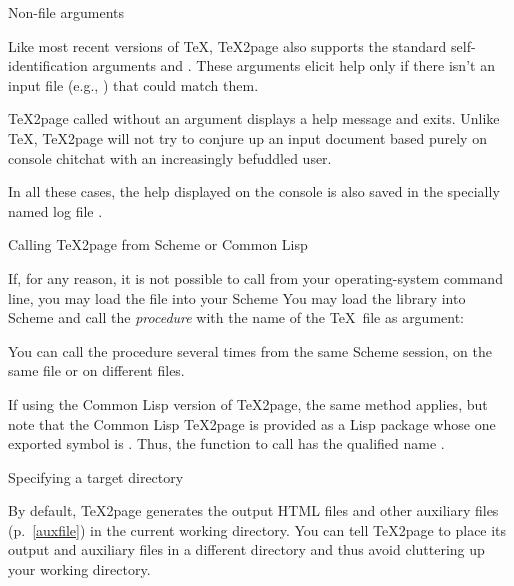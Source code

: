\beginsection Non-file arguments

%
%
Like most recent versions of \TeX, \TeX2page also
supports the standard self-identification
arguments  and .  These
arguments elicit help only if there isn’t an input file
(e.g., ) that could match them.

\TeX2page called without an argument displays a help
message and exits.  Unlike \TeX, \TeX2page will not try
to conjure up an input document based purely on console
chitchat with an increasingly befuddled user.

In all these cases, the help displayed on the console
is also saved in the specially named log file
.

\beginsection Calling \TeX2page from Scheme or Common Lisp

%
\ifx\inpltdist\Undefined
If, for any reason, it is not possible to call 
from your operating-system command line, you may load the
file  into your Scheme
\else
You may load the
library  into Scheme
\fi and call the
{\em procedure}  with the name of the \TeX\ file
as argument:

\ifx\inpltdist\Undefined
{}
\else
{}
\fi

\n You can call the procedure
 several times from the same Scheme
session, on the same file or on different files.

If using the Common Lisp version of \TeX2page, the same method applies,
but note that the Common Lisp \TeX2page is provided as a Lisp package
 whose one exported symbol is .  Thus, the
function to call has the qualified name .


\beginsection Specifying a target directory

%
By default, \TeX2page generates the output HTML files
and other auxiliary files (p.~\ref{auxfile}) in the
current working directory.  You can tell \TeX2page
to place its output and auxiliary files in a different
directory and thus avoid cluttering up your working
directory.

